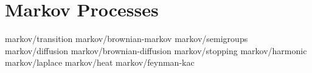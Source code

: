 \chapter	{Markov Processes}

	{markov/transition}
	{markov/brownian-markov}
	{markov/semigroups}
	{markov/diffusion}
	{markov/brownian-diffusion}
	{markov/stopping}
	{markov/harmonic}
	{markov/laplace}
	{markov/heat}
	{markov/feynman-kac}

